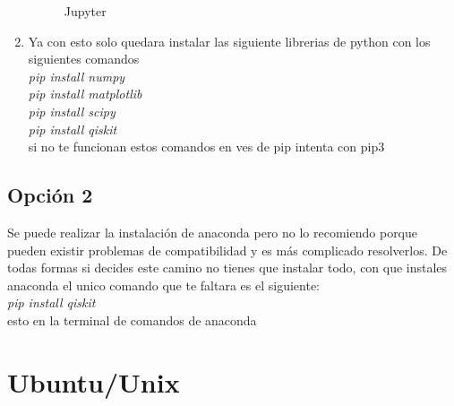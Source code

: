 \documentclass[12pt,letterpaper]{report}
\begin{document}
\begin{enumerate}
\begin{figure}[H]
        \caption{Jupyter}
        \label{jupyter}
    \end{figure}
    \item Ya con esto solo quedara instalar las siguiente librerias de python con los siguientes comandos\\
    \textit{pip install numpy\\
    pip install matplotlib\\
    pip install scipy\\
    pip install qiskit\\}
    si no te funcionan estos comandos en ves de pip intenta con pip3
\end{enumerate}
\subsection*{Opci\'on 2}
Se puede realizar la instalaci\'on de anaconda pero no lo recomiendo porque pueden existir problemas de compatibilidad y es m\'as complicado resolverlos. De todas formas si decides este camino no tienes que instalar todo, con que instales anaconda el unico comando que te faltara es el siguiente:\\
\textit{pip install qiskit}\\
esto en la terminal de comandos de anaconda
\section*{Ubuntu/Unix}
\end{document}
